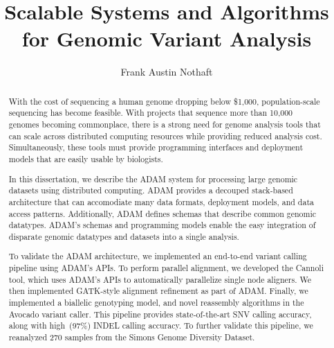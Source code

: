 \documentclass[phd]{ucbthesis}
\begin{document}
\title{Scalable Systems and Algorithms for Genomic Variant Analysis}
\author{Frank Austin Nothaft}


\maketitle

\approvalpage
\copyrightpage

\begin{abstract}
  With the cost of sequencing a human genome dropping below \$1,000,
  population-scale sequencing has become feasible. With projects that sequence
  more than 10,000 genomes becoming commonplace, there is a strong need for
  genome analysis tools that can scale across distributed computing
  resources while providing reduced analysis cost. Simultaneously, these tools
  must provide programming interfaces and deployment models that are easily
  usable by biologists.

  In this dissertation, we describe the {ADAM} system for processing
  large genomic datasets using distributed computing. {ADAM} provides
  a decouped stack-based architecture that can accomodiate many data formats,
  deployment models, and data access patterns. Additionally, {ADAM}
  defines schemas that describe common genomic datatypes. {ADAM}'s
  schemas and programming models enable the easy integration of disparate
  genomic datatypes and datasets into a single analysis.

  To validate the {ADAM} architecture, we implemented an end-to-end
  variant calling pipeline using {ADAM}'s APIs. To perform parallel
  alignment, we developed the {Cannoli} tool, which uses {ADAM}'s
  APIs to automatically parallelize single node aligners. We then
  implemented {GATK}-style alignment refinement as part of {ADAM}.
  Finally, we implemented a biallelic genotyping model, and novel reassembly
  algorithms in the {Avocado} variant caller. This pipeline provides
  state-of-the-art SNV calling accuracy, along with high~(97\%) INDEL calling
  accuracy. To further validate this pipeline, we reanalyzed 270 samples from
  the Simons Genome Diversity Dataset.
\end{abstract}

\frontmatter

\tableofcontents
\end{document}

